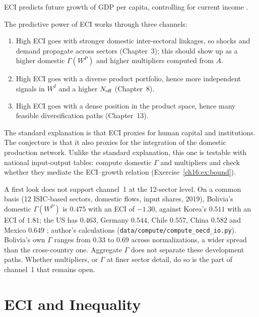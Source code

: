 \documentclass[../structural_economics_book.tex]{subfiles}
\begin{document}
\begin{empiricalresult}\label{ch16:prop:ECI_growth}
ECI predicts future growth of GDP per capita, controlling for current income \citep{hidalgo2009building,hausmann2014atlas}.
\end{empiricalresult}

\begin{conjecture}\label{ch16:conj:ECI_growth}
The predictive power of ECI works through three channels:
\begin{enumerate}
\item High ECI goes with stronger domestic inter-sectoral linkages, so shocks and demand propagate across sectors (Chapter~3); this should show up as a higher domestic $\Gamma(W^P)$ and higher multipliers computed from $A$.
\item High ECI goes with a diverse product portfolio, hence more independent signals in $W^I$ and a higher $N_{\text{eff}}$ (Chapter~8).
\item High ECI goes with a dense position in the product space, hence many feasible diversification paths (Chapter~13).
\end{enumerate}
\end{conjecture}

The standard explanation is that ECI proxies for human capital and institutions. The conjecture is that it also proxies for the integration of the domestic production network. Unlike the standard explanation, this one is testable with national input-output tables: compute domestic $\Gamma$ and multipliers and check whether they mediate the ECI--growth relation (Exercise~\ref{ch16:ex:bound}).

A first look does not support channel~1 at the 12-sector level. On a common basis (12 ISIC-based sectors, domestic flows, input shares, 2019), Bolivia's domestic $\Gamma(W^P)$ is $0.475$ with an ECI of $-1.30$, against Korea's $0.511$ with an ECI of $1.81$; the US has $0.463$, Germany $0.544$, Chile $0.557$, China $0.582$ and Mexico $0.649$ \citep{ine2026sut,oecd2023icio}; author's calculations (\texttt{data/compute/compute\_oecd\_io.py}). Bolivia's own $\Gamma$ ranges from $0.33$ to $0.69$ across normalizations, a wider spread than the cross-country one. Aggregate $\Gamma$ does not separate these development paths. Whether multipliers, or $\Gamma$ at finer sector detail, do so is the part of channel~1 that remains open.


\section{ECI and Inequality}
\label{ch16:sec:inequality}
\end{document}
